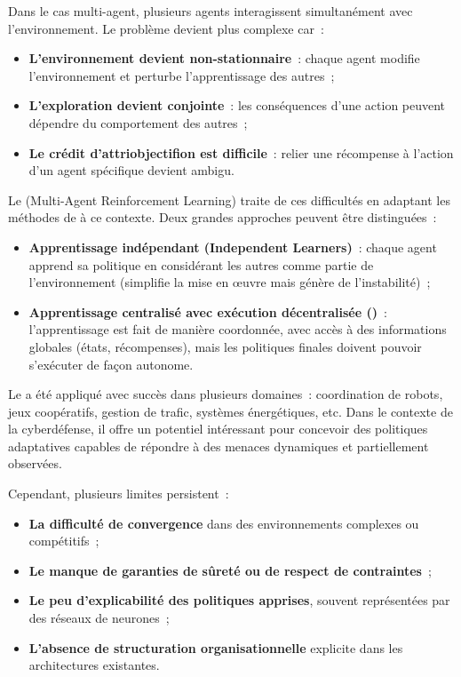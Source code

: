 Dans le cas multi-agent, plusieurs agents interagissent simultanément avec l'environnement. Le problème devient plus complexe car~:
\begin{itemize}
    \item \textbf{L'environnement devient non-stationnaire}~: chaque agent modifie l'environnement et perturbe l'apprentissage des autres~;
    \item \textbf{L'exploration devient conjointe}~: les conséquences d'une action peuvent dépendre du comportement des autres~;
    \item \textbf{Le crédit d'attriobjectifion est difficile}~: relier une récompense à l'action d'un agent spécifique devient ambigu.
\end{itemize}

Le  (Multi-Agent Reinforcement Learning) traite de ces difficultés en adaptant les méthodes de  à ce contexte. Deux grandes approches peuvent être distinguées~:
\begin{itemize}
    \item \textbf{Apprentissage indépendant (Independent Learners)}~: chaque agent apprend sa politique en considérant les autres comme partie de l'environnement (simplifie la mise en œuvre mais génère de l'instabilité)~;
    \item \textbf{Apprentissage centralisé avec exécution décentralisée ()}~: l'apprentissage est fait de manière coordonnée, avec accès à des informations globales (états, récompenses), mais les politiques finales doivent pouvoir s'exécuter de façon autonome.
\end{itemize}


Le  a été appliqué avec succès dans plusieurs domaines~: coordination de robots, jeux coopératifs, gestion de trafic, systèmes énergétiques, etc. Dans le contexte de la cyberdéfense, il offre un potentiel intéressant pour concevoir des politiques adaptatives capables de répondre à des menaces dynamiques et partiellement observées.

Cependant, plusieurs limites persistent~:
\begin{itemize}
    \item \textbf{La difficulté de convergence} dans des environnements complexes ou compétitifs~;
    \item \textbf{Le manque de garanties de sûreté ou de respect de contraintes}~;
    \item \textbf{Le peu d'explicabilité des politiques apprises}, souvent représentées par des réseaux de neurones~;
    \item \textbf{L'absence de structuration organisationnelle} explicite dans les architectures existantes.
\end{itemize}

